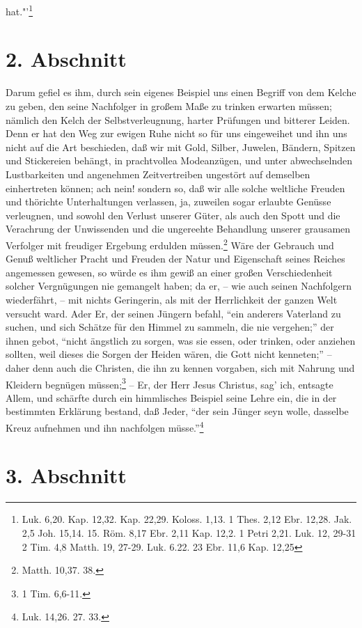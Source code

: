 hat."'\footnote{Luk. 6,20. Kap. 12,32. Kap. 22,29. Koloss. 1,13. 1 Thes. 2,12 Ebr. 12,28. Jak. 2,5 Joh. 15,14. 15. Röm. 8,17 Ebr. 2,11  Kap. 12,2. 1 Petri 2,21. Luk. 12, 29-31 2 Tim. 4,8 Matth. 19, 27-29. Luk. 6.22. 23 Ebr. 11,6 Kap. 12,25}

\section{2. Abschnitt}

Darum gefiel es ihm, durch sein eigenes Beispiel uns einen Begriff von dem Kelche zu geben, den seine Nachfolger in großem Maße zu trinken erwarten müssen; nämlich den Kelch der Selbstverleugnung, harter Prüfungen und bitterer Leiden. Denn er hat den Weg zur ewigen Ruhe nicht so für uns eingeweihet und ihn uns nicht auf die Art beschieden, daß wir mit Gold, Silber, Juwelen, Bändern, Spitzen und Stickereien behängt, in prachtvollea Modeanzügen, und unter abwechselnden Lustbarkeiten und angenehmen Zeitvertreiben ungestört auf demselben einhertreten können; ach nein! sondern so, daß wir alle solche weltliche Freuden und thörichte Unterhaltungen verlassen, ja, zuweilen sogar erlaubte Genüsse verleugnen, und sowohl den Verlust unserer Güter, als auch den Spott und die Verachrung der Unwissenden und die ungereehte Behandlung unserer grausamen Verfolger mit freudiger Ergebung erdulden müssen.\footnote{Matth. 10,37. 38. } Wäre der Gebrauch und Genuß weltlicher Pracht und Freuden der Natur und Eigenschaft seines Reiches angemessen gewesen, so würde es ihm gewiß an einer großen Verschiedenheit solcher Vergnügungen nie gemangelt haben; da er, -- wie auch seinen Nachfolgern wiederfährt, -- mit nichts Geringerin, als mit der Herrlichkeit der ganzen Welt versucht ward. Ader Er, der seinen Jüngern befahl, "`ein anderers Vaterland zu suchen, und sich Schätze für den Himmel zu sammeln, die nie vergehen;"' der ihnen gebot, "`nicht ängstlich zu sorgen, was sie essen, oder trinken, oder anziehen sollten, weil dieses die Sorgen der Heiden wären, die Gott nicht kenneten;"' – daher denn auch die Christen, die ihn zu kennen vorgaben, sich mit Nahrung und Kleidern begnügen müssen;\footnote{1 Tim. 6,6-11.} -- Er, der Herr Jesus Christus, sag’ ich, entsagte Allem, und schärfte durch ein himmlisches Beispiel seine Lehre ein, die in der bestimmten Erklärung bestand, daß Jeder, "`der sein Jünger seyn wolle, dasselbe Kreuz aufnehmen und ihn nachfolgen müsse."'\footnote{Luk. 14,26. 27. 33.}

\section{3. Abschnitt}

